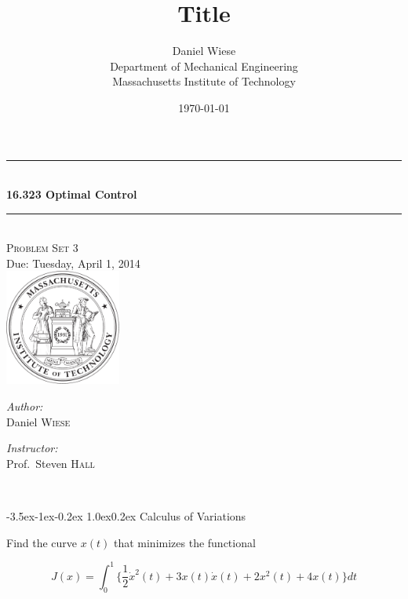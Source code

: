 \documentclass[11pt,letterpaper,onecolumn,notitlepage]{article}
\title{\textbf{Title}}
\author{Daniel Wiese \\ Department of Mechanical Engineering \\ Massachusetts Institute of Technology}
\date{\today}
\makeatletter
\renewcommand\section{\@startsection{section}{1}{\z@}%
{-3.5ex\@plus-1ex\@minus-0.2ex}%
{1.0ex\@plus0.2ex}%
{\fontsize{12pt}{12pt}\selectfont\bfseries\sffamily}}
\makeatother
\begin{document}
  \begin{titlepage}
    \begin{center}
      \rule{\linewidth}{0.01in} \\[0.25in]
      {\huge\bfseries 16.323 Optimal Control}\\[0.4cm]
      \rule{\linewidth}{0.01in} \\[0.25in]

      \textsc{\LARGE Problem Set 3}\\[0.15in]
      \large Due: Tuesday, April 1, 2014 \\[1.0in]
      \includegraphics[width=1.5in]{../fig/mit-seal.pdf}\\[3.0in]

      \begin{minipage}{0.4\textwidth}
        \begin{flushleft} \large
          \emph{Author:}\\
          Daniel \textsc{Wiese}
          \vfill
        \end{flushleft}
      \end{minipage}
      \begin{minipage}{0.4\textwidth}
        \begin{flushright} \large
          \emph{Instructor:} \\
          Prof.~Steven \textsc{Hall} \\
        \end{flushright}
      \end{minipage} \\
      \vfill
    \end{center}
  \end{titlepage}

  \clearpage
  \section{Calculus of Variations}

  Find the curve $x(t)$ that minimizes the functional

  \begin{equation*}
    J(x)=\int_{0}^{1}\biggr\{\frac{1}{2}\dot{x}^{2}(t)+3x(t)\dot{x}(t)+2x^{2}(t)+4x(t)\biggr\}dt
  \end{equation*}
\end{document}
